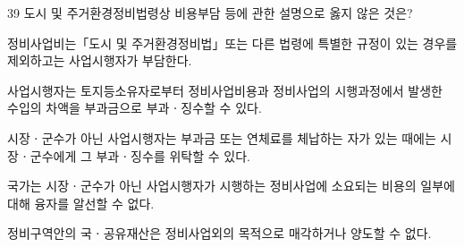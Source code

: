\begin{question}{39}
도시 및 주거환경정비법령상 비용부담 등에 관한 설명으로 옳지 않은 것은?
\begin{choices}
  \item 정비사업비는「도시 및 주거환경정비법」또는 다른 법령에 특별한 규정이 있는 경우를 제외하고는 사업시행자가 부담한다.
  \item 사업시행자는 토지등소유자로부터 정비사업비용과 정비사업의 시행과정에서 발생한 수입의 차액을 부과금으로 부과ㆍ징수할 수 있다.
  \item 시장ㆍ군수가 아닌 사업시행자는 부과금 또는 연체료를 체납하는 자가 있는 때에는 시장ㆍ군수에게 그 부과ㆍ징수를 위탁할 수 있다.
  \item 국가는 시장ㆍ군수가 아닌 사업시행자가 시행하는 정비사업에 소요되는 비용의 일부에 대해 융자를 알선할 수 없다.
  \item 정비구역안의 국ㆍ공유재산은 정비사업외의 목적으로 매각하거나 양도할 수 없다.
\end{choices}
\end{question}
